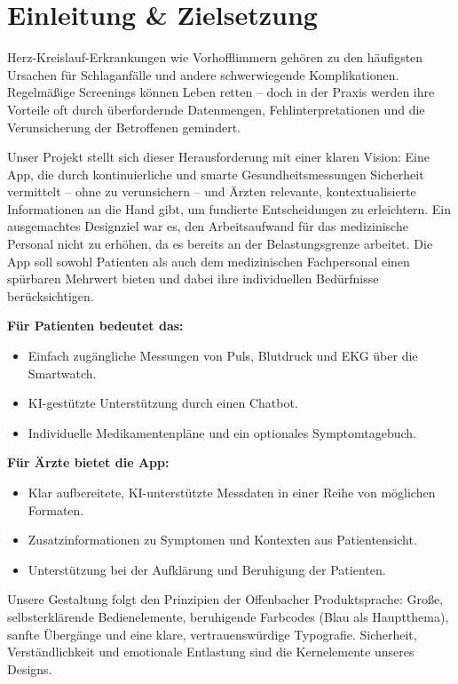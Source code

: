 \section{Einleitung \& Zielsetzung}
Herz-Kreislauf-Erkrankungen wie Vorhofflimmern gehören zu den häufigsten Ursachen für Schlaganfälle und andere schwerwiegende Komplikationen. Regelmäßige Screenings können Leben retten – doch in der Praxis werden ihre Vorteile oft durch überfordernde Datenmengen, Fehlinterpretationen und die Verunsicherung der Betroffenen gemindert.

Unser Projekt stellt sich dieser Herausforderung mit einer klaren Vision: Eine App, die durch kontinuierliche und smarte Gesundheitsmessungen Sicherheit vermittelt – ohne zu verunsichern – und Ärzten relevante, kontextualisierte Informationen an die Hand gibt, um fundierte Entscheidungen zu erleichtern. Ein ausgemachtes Designziel war es, den Arbeitsaufwand für das medizinische Personal nicht zu erhöhen, da es bereits an der Belastungsgrenze arbeitet. Die App soll sowohl Patienten als auch dem medizinischen Fachpersonal einen spürbaren Mehrwert bieten und dabei ihre individuellen Bedürfnisse berücksichtigen.

\vspace{1em}

\textbf{Für Patienten bedeutet das:}
\begin{itemize}
	\item Einfach zugängliche Messungen von Puls, Blutdruck und EKG über die Smartwatch.
	\item KI-gestützte Unterstützung durch einen Chatbot.
	\item Individuelle Medikamentenpläne und ein optionales Symptomtagebuch.
\end{itemize}

\newpage

\textbf{Für Ärzte bietet die App:}
\begin{itemize}
	\item Klar aufbereitete, KI-unterstützte Messdaten in einer Reihe von möglichen Formaten.
	\item Zusatzinformationen zu Symptomen und Kontexten aus Patientensicht.
	\item Unterstützung bei der Aufklärung und Beruhigung der Patienten.
\end{itemize}

Unsere Gestaltung folgt den Prinzipien der Offenbacher Produktsprache: Große, selbsterklärende Bedienelemente, beruhigende Farbcodes (Blau als Hauptthema), sanfte Übergänge und eine klare, vertrauenswürdige Typografie. Sicherheit, Verständlichkeit und emotionale Entlastung sind die Kernelemente unseres Designs.
